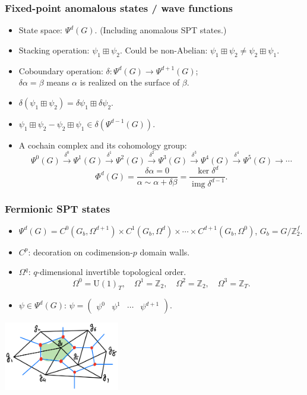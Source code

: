 \documentclass[xcolor=table, aspectratio=169]{beamer}
\newcommand{\uone}{\mathrm U(1)}
\DeclareMathOperator{\img}{img}
\begin{document}
\begin{frame}
	\frametitle{Fixed-point anomalous states / wave functions}
	\begin{itemize}
		\item State space: $\Psi^d(G)$. (Including \alert{anomalous} SPT states.)
		\item Stacking operation: $\psi_1\boxplus\psi_2$.
		Could be non-Abelian: $\psi_1\boxplus\psi_2\neq\psi_2\boxplus\psi_1$.
		\item Coboundary operation: $\delta:\Psi^d(G)\rightarrow\Psi^{d+1}(G)$;\\
		$\delta\alpha=\beta$ means $\alpha$ is realized on the surface of $\beta$.
		\item $\delta(\psi_1\boxplus\psi_2)=\delta\psi_1\boxplus\delta\psi_2$.
		\item $\psi_1\boxplus\psi_2-\psi_2\boxplus\psi_1\in \delta(\Psi^{d-1}(G))$.
		\item A cochain complex and its cohomology group:
		\[\Psi^0(G)\xrightarrow{\delta^0}\Psi^1(G)
		\xrightarrow{\delta^1}\Psi^2(G)
		\xrightarrow{\delta^2}\Psi^3(G)
		\xrightarrow{\delta^3}\Psi^4(G)
		\xrightarrow{\delta^4}\Psi^5(G)
		\rightarrow\cdots\]
	\[\Phi^d(G) =\frac{\delta\alpha=0}{\alpha\sim\alpha+\delta\beta}=\frac{\ker \delta^d}{\img \delta^{d-1}}.\]
	\end{itemize}
\end{frame}

\begin{frame}
	\frametitle{Fermionic SPT states}
	\begin{itemize}
		\item $\Psi^d(G)=C^0(G_b, \Omega^{d+1})\times C^1(G_b, \Omega^d)\times\cdots\times
	  C^{d+1}(G_b, \Omega^0)$, $G_b=G/\mathbb Z_2^f$.
		\item $C^p$: decoration on codimension-$p$ domain walls.
		\item $\Omega^q$: $q$-dimensional invertible topological order.
		\[\Omega^0=\uone_T,\quad\Omega^1=\mathbb Z_2,\quad\Omega^2=\mathbb Z_2,\quad\Omega^3=\mathbb Z_T.\]
		\item $\psi\in \Psi^d(G)$: $\psi=\begin{pmatrix}\psi^0&\psi^1&\cdots&\psi^{d+1}\end{pmatrix}$.
	\end{itemize}
	\begin{center}
		\includegraphics[height=3cm]{decoration}
	\end{center}
\end{frame}
\end{document}
